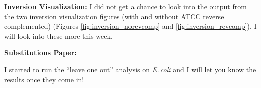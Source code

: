 \documentclass[12pt]{article}
\newcommand{\ecol}{\textit{E.\,coli}\xspace}
\begin{document}
\textbf{Inversion Visualization:}
I did not get a chance to look into the output from the two inversion visualization figures (with and without ATCC reverse complemented) (Figures \ref{fig:inversion_norevcomp} and \ref{fig:inversion_revcomp}).
I will look into these more this week.




\textbf{Substitutions Paper:}

I started to run the ``leave one out'' analysis on \ecol and I will let you know the results once they come in!
\end{document}
